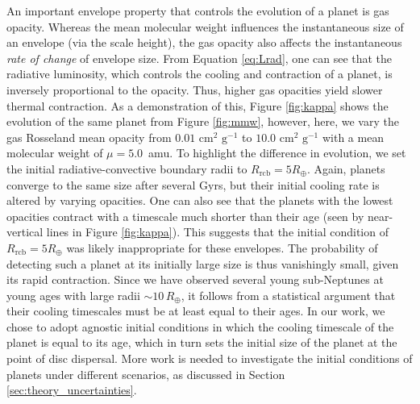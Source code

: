 \documentclass[fleqn,usenatbib]{mnras}
\begin{document}
An important envelope property that controls the evolution of a planet is gas opacity. Whereas the mean molecular weight influences the instantaneous size of an envelope (via the scale height), the gas opacity also affects the instantaneous \textit{rate of change} of envelope size. From Equation \ref{eq:Lrad}, one can see that the radiative luminosity, which controls the cooling and contraction of a planet, is inversely proportional to the opacity. Thus, higher gas opacities yield slower thermal contraction. As a demonstration of this, Figure \ref{fig:kappa} shows the evolution of the same planet from Figure \ref{fig:mmw}, however, here, we vary the gas Rosseland mean opacity from $0.01 \text{ cm}^2 \text{ g}^{-1}$ to $10.0 \text{ cm}^2 \text{ g}^{-1}$ with a mean molecular weight of $\mu = 5.0$~amu. To highlight the difference in evolution, we set the initial radiative-convective boundary radii to $R_\text{rcb} = 5 R_\oplus$. Again, planets converge to the same size after several Gyrs, but their initial cooling rate is altered by varying opacities. One can also see that the planets with the lowest opacities contract with a timescale much shorter than their age (seen by near-vertical lines in Figure \ref{fig:kappa}). This suggests that the initial condition of $R_\text{rcb} = 5 R_\oplus$ was likely inappropriate for these envelopes. The probability of detecting such a planet at its initially large size is thus vanishingly small, given its rapid contraction. Since we have observed several young sub-Neptunes at young ages with large radii $\sim 10 \,R_\oplus$, it follows from a statistical argument that their cooling timescales must be at least equal to their ages. In our work, we chose to adopt agnostic initial conditions in which the cooling timescale of the planet is equal to its age, which in turn sets the initial size of the planet at the point of disc dispersal. More work is needed to investigate the initial conditions of planets under different scenarios, as discussed in Section \ref{sec:theory_uncertainties}.
\end{document}
